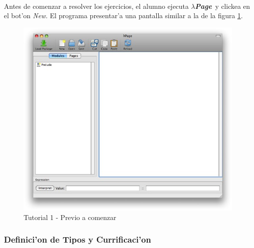 \documentclass[a4paper]{article}
\newcommand{\hpage}{\textbf{\textsl{$\lambda$Page}}}
\begin{document}
\paragraph{}Antes de comenzar a resolver los ejercicios, el alumno ejecuta \hpage\ y clickea en el bot'on \textsl{New}.  El programa presentar'a una pantalla similar a la de la figura \ref{tut100}.
\begin{figure}[hp]
	\begin{center}
        	\includegraphics[width=.75\textwidth]{pictures/tut1/00}
		\caption{Tutorial 1 - Previo a comenzar}
		\label{tut100}
	\end{center}
\end{figure}

\newpage
\subsubsection{Definici'on de Tipos y Currificaci'on}
\end{document}
